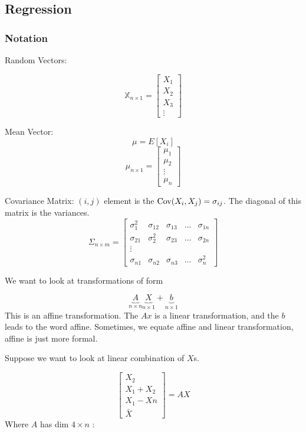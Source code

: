 \documentclass{report}
\begin{document}
\subsection{Regression} 

\subsubsection{Notation}
Random Vectors: 

\[
	\mathbb{X}_{n \times 1} = \begin{bmatrix}
		X_1\\
		X_2\\
		X_3\\
		\vdots
	\end{bmatrix}
\]

Mean Vector:
\[
\mu  = E[X_{i}]
\]
\[
\mu _{n \times 1} = \begin{bmatrix}
	\mu_{1}\\
	\mu _{2}\\
	\vdots\\
\mu _{n}
\end{bmatrix}
\]


Covariance Matrix: $(i,j)$  element is the $\operatorname{Cov}(X_{i}, X_{j}) = \sigma_{ij}$. The diagonal of this matrix is the variances. 
\[ \Sigma_{n \times m} = 
\begin{bmatrix}
	\sigma_{1}^{2} & \sigma_{12} &\sigma_{13} &\dots  &\sigma_{1n} \\
	\sigma_{21} &\sigma_{2}^{2} &\sigma_{23} &\dots &\sigma_{2n} \\
	\vdots \\
	\sigma_{n1} &\sigma_{n2} &\sigma_{n3}&\dots &\sigma^{2}_{n}
\end{bmatrix}
\]

We want to look at transformations of form 

\[
	\underbrace{A}_{n \times n}\underbrace{X}_{n \times 1} + \underbrace{b}_{n \times 1}
\]
This is an affine transformation. The $Ax$  is a linear transformation, and the $b$  leads to the word affine. Sometimes, we equate affine and linear transformation, affine is just more formal. 


Suppose we want to look at linear combination of $X$s. 

\[
\begin{bmatrix}
	X_2\\
	X_1+X_2 \\
	X_1- Xn\\
	\bar X
\end{bmatrix} 
=  AX
\]
Where $A$ has dim $4 \times n$  : 
\end{document}
